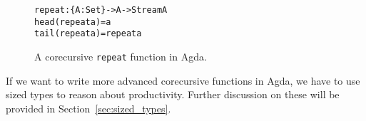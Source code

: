\begin{figure}
\begin{alltt}
repeat : \{A : Set\} -> A -> Stream A
head (repeat a) = a
tail (repeat a) = repeat a 
\end{alltt}
\caption{A corecursive \texttt{repeat} function in Agda.}
\label{fig:agda_repeat}
\end{figure}

If we want to write more advanced corecursive functions in Agda, we have to use sized types to reason about productivity. Further discussion on these will be provided in Section~\ref{sec:sized_types}.


